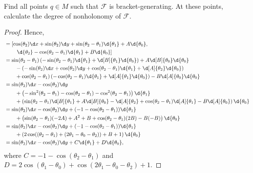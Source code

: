 \documentclass{article}
\begin{document}
 Find all points $q \in M$ such that $\mathcal F$ is bracket-generating. At these points, calculate the degree of nonholonomy of $\mathcal F$.
\begin{proof}
Hence,
\begin{align*}
[X_1, X_2] & = \left[ \cos(\theta_2) \d x  + \sin(\theta_2) \d y  + \sin(\theta_2 - \theta_1)  \d {\theta_1} + A \d {\theta_0}, \right.
\\ & \quad \quad \left. \d {\theta_2} - \cos(\theta_2 - \theta_1) \d {\theta_1} + B \d {\theta_0} \right]
\\ & =  \sin(\theta_2 - \theta_1) \left( -\sin(\theta_2 - \theta_1) \d {\theta_1} + \d[B] {\theta_1} \d {\theta_0} \right) + A \d[B] {\theta_0} \d {\theta_0}
\\ & \quad \quad - \left( -\sin(\theta_2) \d x + \cos(\theta_2) \d y + \cos (\theta_2 - \theta_1) \d {\theta_1} + \d[A] {\theta_2} \d {\theta_0} \right) 
\\ & \quad \quad + \cos(\theta_2 - \theta_1) \left( -\cos(\theta_2 - \theta_1) \d {\theta_1} + \d[A] {\theta_1} \d {\theta_0} \right) - B \d[A] {\theta_0} \d {\theta_0}
\\ & = \sin(\theta_2) \d x  - \cos(\theta_2) \d y  
\\ & \quad \quad + \left(- \sin^2(\theta_2 - \theta_1) - \cos (\theta_2 - \theta_1) - \cos^2(\theta_2 - \theta_1) \right) \d {\theta_1}
\\ & \quad \quad + \left(  \sin (\theta_2 - \theta_1) \d[B] {\theta_1}  + A \d[B] {\theta_0} -  \d[A]{\theta_2} + \cos(\theta_2 - \theta_1) \d[A] {\theta_1} - B \d[A]{\theta_0} \right) \d {\theta_0}
\\ & = \sin(\theta_2) \d x  - \cos(\theta_2) \d y + (-1 - \cos(\theta_2 - \theta_1)) \d {\theta_1}
\\ & \quad \quad + \left(  \sin (\theta_2 - \theta_1) (-2A)  + A^2 +  B + \cos(\theta_2 - \theta_1) (2B) - B(-B) \right) \d {\theta_0}
\\ & = \sin(\theta_2) \d x  - \cos(\theta_2) \d y + (-1 - \cos(\theta_2 - \theta_1)) \d {\theta_1}
\\ & \quad \quad  + \left( 2 \cos((\theta_2 - \theta_1) + (2\theta_1 - \theta_0 - \theta_2)) +  B + 1  \right) \d {\theta_0}
\\ & = \sin(\theta_2) \d x  - \cos(\theta_2) \d y + C \d {\theta_1} + D \d {\theta_0},
\end{align*}
where $C = -1 - \cos(\theta_2 - \theta_1) $
 and $D = 2 \cos(\theta_1 - \theta_0) +  \cos(2 \theta_1 - \theta_0 - \theta_2) + 1$.


\end{proof}
\end{document}

